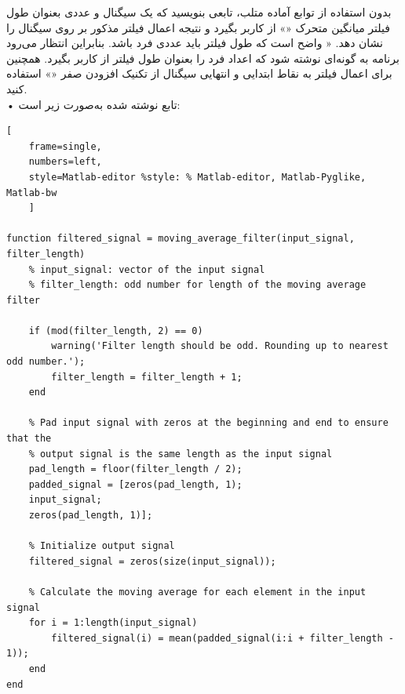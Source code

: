 \documentclass[12pt]{exam}
\newcommand{\class}{آزمایشگاه DSP}
\begin{document}

\pagestyle{empty}


\pagestyle{head}
\firstpageheader{}{}{}
\runningheader{صفحه \thepage\ از \numpages}{}{\class}
\runningheadrule

\vspace{0pt}




\begin{questions}

\question
بدون استفاده از توابع آماده متلب، تابعی بنویسید که یک سیگنال و عددی بعنوان طول فیلتر میانگین متحرک «» از کاربر بگیرد و نتیجه اعمال فیلتر مذکور بر روی سیگنال را نشان دهد. « واضح است که طول فیلتر باید عددی فرد باشد. بنابراین انتظار می‌رود برنامه به گونه‌ای نوشته شود که اعداد فرد را بعنوان طول فیلتر از کاربر بگیرد. همچنین برای اعمال فیلتر به نقاط ابتدایی و انتهایی سیگنال از تکنیک افزودن صفر «» استفاده کنید. \\

• تابع نوشته شده به‌صورت زیر است: 
\begin{latin}
\begin{lstlisting}[
	frame=single,
	numbers=left,
	style=Matlab-editor %style: % Matlab-editor, Matlab-Pyglike, Matlab-bw
	] 
	
function filtered_signal = moving_average_filter(input_signal, filter_length)
	% input_signal: vector of the input signal
	% filter_length: odd number for length of the moving average filter
	
	if (mod(filter_length, 2) == 0)
		warning('Filter length should be odd. Rounding up to nearest odd number.');
		filter_length = filter_length + 1;
	end
	
	% Pad input signal with zeros at the beginning and end to ensure that the
	% output signal is the same length as the input signal
	pad_length = floor(filter_length / 2);
	padded_signal = [zeros(pad_length, 1);
	input_signal;
	zeros(pad_length, 1)];
	
	% Initialize output signal
	filtered_signal = zeros(size(input_signal));
	
	% Calculate the moving average for each element in the input signal
	for i = 1:length(input_signal)
		filtered_signal(i) = mean(padded_signal(i:i + filter_length - 1));
	end
end

\end{lstlisting}
\end{latin}


\end{questions}
\end{document}

